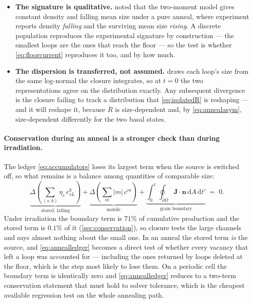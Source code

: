 \documentclass{article}
\newcommand{\nvec}{\bm n}
\begin{document}
\begin{itemize}
\item \textbf{The signature is qualitative.}  noted that the
      two-moment model gives constant density and falling mean size under a pure
      anneal, where experiment reports density \emph{falling} and the surviving
      mean size \emph{rising}. A discrete population reproduces the experimental
      signature by construction --- the smallest loops are the ones that reach the
      floor --- so the test is whether \cref{eq:floorcurrent} reproduces it too,
      and by how much.
\item \textbf{The dispersion is transferred, not assumed.} 
      draws each loop's size from the same log-normal the closure integrates, so
      at $t=0$ the two representations agree on the distribution exactly. Any
      subsequent divergence is the closure failing to track a distribution that
      \cref{eq:isolatedR} is reshaping --- and it will reshape it, because
      $\dot R$ is size-dependent and, by \cref{eq:annealasym}, size-dependent
      differently for the two basal states.
\end{itemize}

\paragraph{Conservation during an anneal is a stronger check than during
irradiation.} The ledger \cref{eq:accumulators} loses its largest term when the
source is switched off, so what remains is a balance among quantities of
comparable size:
\begin{equation}
  \underbrace{\Delta\!\left(\textstyle\sum_{(s,k)}\eta_s\,c^k_{sL}\right)}
             _{\text{stored, falling}}
  +\underbrace{\Delta\!\left(\textstyle\sum_m|m|\,c^m\right)}_{\text{mobile}}
  +\underbrace{\int_0^t\!\!\oint_{\partial\Omega}\bm J\!\cdot\!\nvec\,
     \mathrm dA\,\mathrm dt'}_{\text{grain boundary}}
  \;=\;0 .
  \label{eq:annealledger}
\end{equation}
Under irradiation the boundary term is $71\%$ of cumulative production and the
stored term is $0.1\%$ of it (\cref{sec:conservation}), so closure tests the
large channels and says almost nothing about the small one. In an anneal the
stored term \emph{is} the source, and \cref{eq:annealledger} becomes a direct
test of whether every vacancy that left a loop was accounted for --- including the
ones returned by loops deleted at the floor, which is the step most likely to lose
them. On a periodic cell the boundary term is identically zero and
\cref{eq:annealledger} reduces to a two-term conservation statement that must
hold to solver tolerance, which is the cheapest available regression test on the
whole annealing path.
\end{document}
